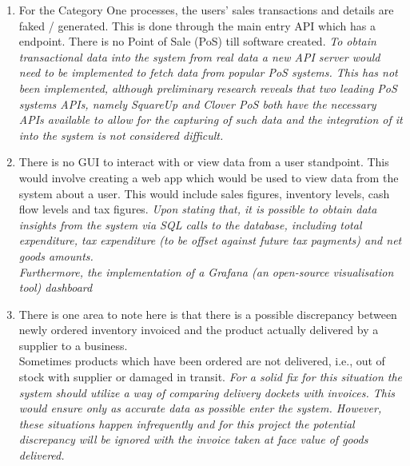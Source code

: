\begin{enumerate}
	\item For the Category One processes, the users' sales transactions and details are faked / generated. This is done through the main entry API which has a 
	      endpoint. There is no Point of Sale (PoS) till software created.
	      \bigbreak
	      \emph{To obtain transactional data into the system from real data a new API server would need to be
		      implemented to fetch data from popular PoS systems. This has not been implemented, although
		      preliminary research reveals that two leading PoS systems APIs, namely SquareUp\autocite{SquareSolutionsTools}
		      and Clover PoS \autocite{APIReferenceOverview} both have the necessary APIs available to
		      allow for the capturing of such data and the integration of it into the system is not considered difficult.}
	\item There is no GUI to interact with or view data from a user standpoint. This would involve creating a web app which would be used to view data from the system about a user. This
	      would include sales figures, inventory levels, cash flow levels and tax figures.
	      \bigbreak
	      \emph{Upon stating that,
		      it is possible to obtain data insights from the system via SQL calls to the database, including total expenditure,
		      tax expenditure (to be offset against future tax payments) and net goods amounts.\\
			  Furthermore, the implementation of a Grafana (an open-source visualisation tool) dashboard}
	\item There is one area to note here is that there is a possible discrepancy between newly ordered inventory invoiced and the product actually delivered
	      by a supplier to a business.\\
	      Sometimes products which have been ordered are not delivered, i.e., out of stock with supplier or damaged in transit.
	      \bigbreak
	      \emph{For a solid fix for this situation the system should utilize a way of comparing delivery dockets with invoices. This would ensure only as accurate data as
		      possible enter the system. However, these situations happen infrequently and for this project the potential discrepancy will be ignored with the invoice taken at
		      face value of goods delivered.}


\end{enumerate}
